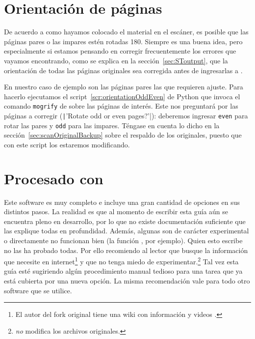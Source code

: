 \documentclass[%
	a5paper,
	10pt,
	twoside,
	openright,
	final,
]{memoir}
\begin{document}
	\section{Orientación de páginas\label{sec:fixOrientation}} De acuerdo a como hayamos colocado el material en el escáner, es posible que las páginas pares o las impares estén rotadas 180\textdegree. Siempre es una buena idea, pero especialmente si estamos pensando en corregir frecuentemente los errores que vayamos encontrando, como se explica en la sección~\ref{sec:SToutput}, que la orientación de todas las páginas originales sea corregida antes de ingresarlas a \scantailor.

	En nuestro caso de ejemplo son las páginas pares las que requieren ajuste. Para hacerlo ejecutamos el script~\ref{scr:orientationOddEven} de Python que invoca el comando \texttt{mogrify} de \imagemagick sobre las páginas de interés. Este nos preguntará por las páginas a corregir (\texttt|'Rotate odd or even pages?'|): deberemos ingresar \texttt{even} para rotar las pares y \texttt{odd} para las impares. Téngase en cuenta lo dicho en la sección~\ref{sec:scanOriginalBackup} sobre el respaldo de los originales, puesto que con este script los estaremos modificando.


	\section{Procesado con \scantailor} Este software es muy completo e incluye una gran cantidad de opciones en sus distintos pasos. La realidad es que al momento de escribir esta guía aún se encuentra pleno en desarrollo, por lo que no existe documentación suficiente que las explique todas en profundidad. Además, algunas son de carácter experimental o directamente no funcionan bien (la función , por ejemplo). Quien esto escribe no las ha probado todas. Por ello recomiendo al lector que busque la información que necesite en internet\footnote{El autor del fork original tiene una wiki con información y videos \cite{ScanTailorWiki}.} y que no tenga miedo de experimentar.\footnote{\scantailor \emph{no} modifica los archivos originales.} Tal vez esta guía esté sugiriendo algún procedimiento manual tedioso para una tarea que ya está cubierta por una nueva opción. La misma recomendación vale para todo otro software que se utilice.
\end{document}
